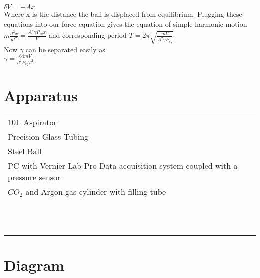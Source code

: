 \documentclass{article}
\begin{document}
$\delta V = -Ax$\\

Where x is the distance the ball is displaced from equilibrium. Plugging these equations into our force equation gives the equation of simple harmonic motion $m\frac{d^2x}{dt^2}= \frac{A^2\gamma P_{eq}x}{V}$ and corresponding period $T = 2\pi \sqrt{\frac{mV}{A^2 \gamma P_{eq}}}$\\

Now $\gamma$ can be separated easily as\\

$\gamma = \frac{64mV}{d^2P_{eq}T^2}$\\


\section{Apparatus}
\begin{tabular}{ll}
10L Aspirator\\
Precision Glass Tubing\\
Steel Ball\\
PC with Vernier Lab Pro Data acquisition system coupled with a pressure sensor\\
$CO_2$ and Argon gas cylinder with filling tube \\\\\\\\\\\\\\\\\\\\\\\\\\
\end{tabular}

\section{Diagram}

\ 

\ 

\ 

\ 

\ 

\ 

\ 

\ 

\ 

\ 

\ 
\end{document}
